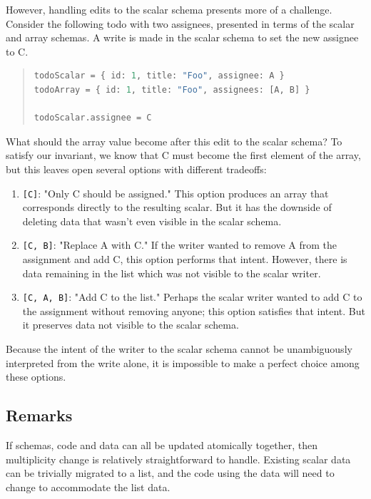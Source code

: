 \documentclass[english,submission]{programming}
\begin{document}
However, handling edits to the scalar schema presents more of a challenge. Consider the following todo with two assignees, presented in terms of the scalar and array schemas. A write is made in the scalar schema to set the new assignee to C.

\begin{quote}
\begin{lstlisting}[language=ml]
todoScalar = { id: 1, title: "Foo", assignee: A }
todoArray = { id: 1, title: "Foo", assignees: [A, B] }

todoScalar.assignee = C
\end{lstlisting}
\end{quote}

What should the array value become after this edit to the scalar schema? To satisfy our invariant, we know that C must become the first element of the array, but this leaves open several options with different tradeoffs:

\begin{enumerate}
  \item \texttt{[C]}: "Only C should be assigned." This option produces an array that corresponds directly to the resulting scalar. But it has the downside of deleting data that wasn't even visible in the scalar schema.
  \item \texttt{[C, B]}: "Replace A with C." If the writer wanted to remove A from the assignment and add C, this option performs that intent. However, there is data remaining in the list which was not visible to the scalar writer.
  \item \texttt{[C, A, B]}: "Add C to the list." Perhaps the scalar writer wanted to add C to the assignment without removing anyone; this option satisfies that intent. But it preserves data not visible to the scalar schema.
\end{enumerate}

Because the intent of the writer to the scalar schema cannot be unambiguously interpreted from the write alone, it is impossible to make a perfect choice among these options.

\subsection{Remarks}

If schemas, code and data can all be updated atomically together, then multiplicity change is relatively straightforward  to handle. Existing scalar data can be trivially migrated to a list, and the code using the data will need to change to accommodate the list data.
\end{document}
